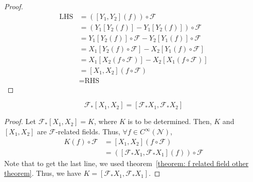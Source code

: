       \begin{proof}
        \begin{align*}
          \text{LHS} &= \left([Y_1,Y_2](f)\right) \circ \mathcal{F} \\
          &= \left(Y_1[Y_2(f)] - Y_1[Y_2(f)] \right) \circ \mathcal{F} \\
          &= Y_1[Y_2(f)] \circ \mathcal{F} - Y_2[Y_1(f)] \circ
          \mathcal{F} \\
          &= X_1[Y_2(f) \circ \mathcal{F}] - X_2[Y_1(f) \circ \mathcal{F}] \\
          &= X_1[X_2(f \circ \mathcal{F})] - X_2[X_1(f \circ \mathcal{F})]\\
          &= [X_1, X_2] (f\circ \mathcal{F}) \\
          &= \text{RHS}
        \end{align*}
      \end{proof}
      \begin{theorem}
        \[\mathcal{F}_{*}[X_1,X_2] =[\mathcal{F}_{*}
        X_1,\mathcal{F}_{*} X_2] \]
      \end{theorem}
      \begin{proof}
        Let $\mathcal{F}_{*}[X_1,X_2] = K$, where $K$ is to be determined.
        Then, $K$ and $[X_1,X_2]$ are $\mathcal{F}$-related fields. Thus,
        $\forall f \in C^\infty(\mathcal{N})$,
        \begin{align*}
          K(f) \circ \mathcal{F} 
          &= [X_1,X_2](f\circ \mathcal{F}) \\
          &= \left([\mathcal{F}_{*}X_1,\mathcal{F}_{*}X_1](f)\right) \circ
          \mathcal{F}
        \end{align*}
        Note that to get the last line, we used theorem~\ref{theorem: f
        related field other theorem}. Thus, we have $K =
        [\mathcal{F}_{*}X_1,\mathcal{F}_{*}X_1]$.
      \end{proof}
